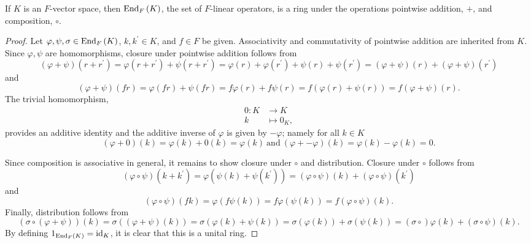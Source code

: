 \documentclass[10pt]{amsart}
\begin{document}
\begin{lem}\label{lem5.1}
  If $K$ is an $F$-vector space, then $\operatorname{End}_{F}\left(K\right)$, the set of $F$-linear operators, is a ring under the operations pointwise addition, $+$, and composition, $\circ$.
\begin{proof}
  Let $\varphi, \psi, \sigma \in \operatorname{End}_{F}\left(K\right)$, $k, k^\prime \in K$, and $f \in F$ be given.
Associativity and commutativity of pointwise addition are inherited from $K$.
Since $\varphi, \psi$ are homomorphisms, closure under pointwise addition follows from 
$$(\varphi + \psi)(r + r^\prime) = \varphi(r + r^\prime) + \psi(r + r^\prime) = \varphi(r) + \varphi(r^\prime) + \psi(r) + \psi(r^\prime) = (\varphi + \psi)(r) + (\varphi + \psi)(r^\prime)$$
and 
$$(\varphi + \psi)(fr) = \varphi(fr) + \psi(fr) = f\varphi(r) + f\psi(r) = f(\varphi(r) + \psi(r))= f(\varphi + \psi)(r).$$
The trivial homomorphism,
\begin{align*}
  0 \colon K & \rightarrow K\\
  k &\mapsto 0_K,
\end{align*}
provides an additive identity and the additive inverse of $\varphi$ is given by $-\varphi$; namely for all $k \in K$
$$(\varphi + 0)(k) = \varphi(k) + 0(k) = \varphi(k)\ \text{and}\ (\varphi + -\varphi)(k) = \varphi(k) - \varphi(k) = 0.$$

Since composition is associative in general, it remains to show closure under $\circ$ and distribution.
Closure under $\circ$ follows from
$$(\varphi \circ \psi)(k + k^\prime) = \varphi(\psi(k) + \psi(k^\prime)) = (\varphi\circ\psi)(k) + (\varphi\circ\psi)(k^\prime)$$
and
$$(\varphi \circ \psi)(fk) = \varphi(f\psi(k)) = f\varphi(\psi(k)) = f(\varphi\circ\psi)(k).$$
Finally, distribution follows from 
$$(\sigma \circ (\varphi + \psi))(k) = \sigma((\varphi+ \psi)(k)) = \sigma(\varphi(k) + \psi(k)) = \sigma(\varphi(k)) + \sigma(\psi(k)) = (\sigma\circ)\varphi(k) + (\sigma\circ\psi)(k).$$
By defining $1_{\operatorname{End}_{F}\left(K\right)} = \operatorname{id}_K$, it is clear that this is a unital ring.
\end{proof}
  \end{lem}
\end{document}
